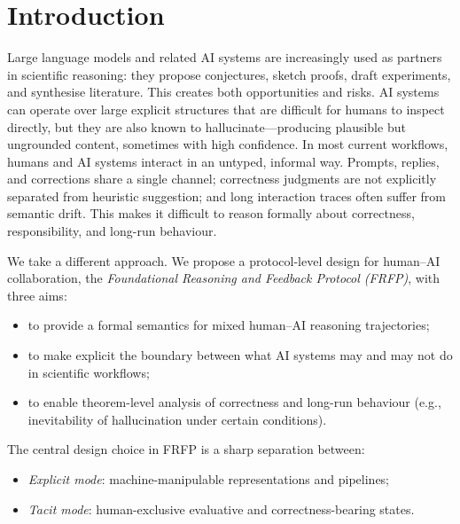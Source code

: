\documentclass[11pt]{article}
\theoremstyle{definition}
\begin{document}
\pagebreak
\tableofcontents
\pagebreak
\section{Introduction}
\label{sec:intro}
Large language models and related AI systems are increasingly used as partners in scientific reasoning: they propose conjectures, sketch proofs, draft experiments, and synthesise literature. This creates both opportunities and risks. AI systems can operate over large explicit structures that are difficult for humans to inspect directly, but they are also known to hallucinate---producing plausible but ungrounded content, sometimes with high confidence. In most current workflows, humans and AI systems interact in an untyped, informal way. Prompts, replies, and corrections share a single channel; correctness judgments are not explicitly separated from heuristic suggestion; and long interaction traces often suffer from semantic drift. This makes it difficult to reason formally about correctness, responsibility, and long-run behaviour.

We take a different approach. We propose a protocol-level design for human--AI collaboration, the \emph{Foundational Reasoning and Feedback Protocol (FRFP)}, with three aims:
\begin{itemize}
  \item to provide a formal semantics for mixed human--AI reasoning trajectories;
  \item to make explicit the boundary between what AI systems may and may not do in scientific workflows;
  \item to enable theorem-level analysis of correctness and long-run behaviour (e.g., inevitability of hallucination under certain conditions).
\end{itemize}

The central design choice in FRFP is a sharp separation between:
\begin{itemize}
  \item \emph{Explicit mode}: machine-manipulable representations and pipelines;
  \item \emph{Tacit mode}: human-exclusive evaluative and correctness-bearing states.
\end{itemize}
\end{document}
